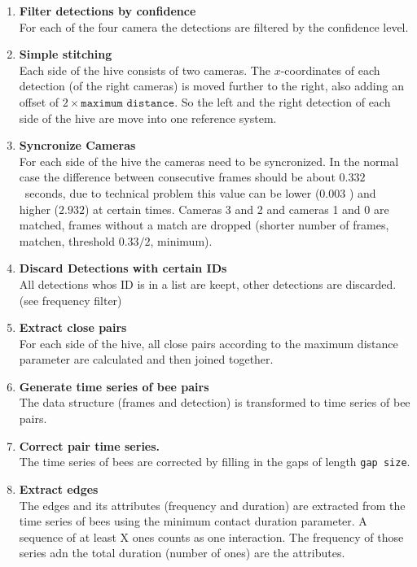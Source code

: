 \begin{enumerate}
\item \textbf{Filter detections by confidence}\\
For each of the four camera the detections are filtered by the confidence level.

\item \textbf{Simple stitching}\\
Each side of the hive consists of two cameras. 	The $x$-coordinates of each detection (of the right	cameras) is moved further to the right, also adding an offset of $2\times \texttt{maximum distance}$. So the left and the right detection of each side of the hive are move into one reference system.

\item \textbf{Syncronize Cameras}\\
For each side of the hive the cameras need to be syncronized. In the normal case the difference between consecutive frames should be about $0.332$~seconds, due to technical problem this value can be lower ($0.003$ ) and higher ($2.932$) at certain times. Cameras 3 and 2 and cameras 1 and 0 are matched, frames without a match are dropped (shorter number of frames, matchen, threshold $0.33/2$, minimum).

\item \textbf{Discard Detections with certain IDs}\\
All detections whos ID is in a list are keept, other detections are discarded. (see frequency filter)

\item \textbf{Extract close pairs}\\
For each side of the hive, all close pairs according to the maximum distance parameter are calculated and then joined together.

\item \textbf{Generate time series of bee pairs}\\
The data structure (frames and detection) is transformed to time series of bee pairs.

\item \textbf{Correct pair time series.}\\
The time series of bees are corrected by filling in the gaps of length \texttt{gap size}.

\item \textbf{Extract edges}\\
The edges and its attributes (frequency and duration) are extracted from the time series of bees using the minimum contact duration parameter. A sequence of at least X ones counts as one interaction. The frequency of those series adn the total duration (number of ones) are the attributes.


\end{enumerate}